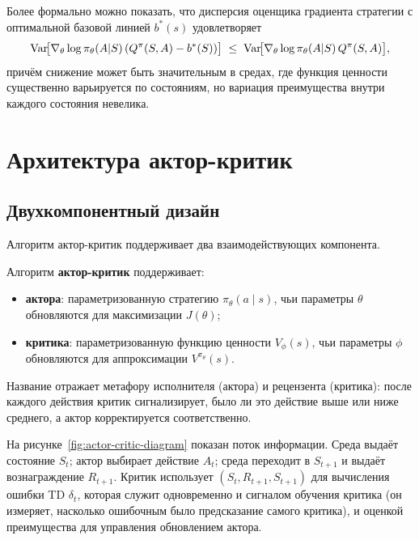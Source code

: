 Более формально можно показать, что дисперсия оценщика градиента стратегии с оптимальной базовой линией $b^*(s)$ удовлетворяет
\begin{equation}
\label{eq:variance-reduction}
\operatorname{Var}\!\bigl[\nabla_\theta \log\pi_\theta(A|S)\,(Q^\pi(S,A) - b^*(S))\bigr]
\;\leq\;
\operatorname{Var}\!\bigl[\nabla_\theta \log\pi_\theta(A|S)\,Q^\pi(S,A)\bigr],
\end{equation}
причём снижение может быть значительным в средах, где функция ценности существенно варьируется по состояниям, но вариация преимущества внутри каждого состояния невелика.

\section{Архитектура актор-критик}
\label{sec:actor-critic-arch}

\subsection{Двухкомпонентный дизайн}

Алгоритм актор-критик поддерживает два взаимодействующих компонента.

\begin{definition}
\label{def:actor-critic}
Алгоритм \textbf{актор-критик} поддерживает:
\begin{itemize}[leftmargin=*]
  \item \textbf{актора}: параметризованную стратегию $\pi_\theta(a \mid s)$, чьи параметры $\theta$ обновляются для максимизации $J(\theta)$;
  \item \textbf{критика}: параметризованную функцию ценности $V_\phi(s)$, чьи параметры $\phi$ обновляются для аппроксимации $V^{\pi_\theta}(s)$.
\end{itemize}
\end{definition}

Название отражает метафору исполнителя (актора) и рецензента (критика): после каждого действия критик сигнализирует, было ли это действие выше или ниже среднего, а актор корректируется соответственно.

На рисунке~\ref{fig:actor-critic-diagram} показан поток информации. Среда выдаёт состояние $S_t$; актор выбирает действие $A_t$; среда переходит в $S_{t+1}$ и выдаёт вознаграждение $R_{t+1}$. Критик использует $(S_t, R_{t+1}, S_{t+1})$ для вычисления ошибки TD $\delta_t$, которая служит одновременно и сигналом обучения критика (он измеряет, насколько ошибочным было предсказание самого критика), и оценкой преимущества для управления обновлением актора.


